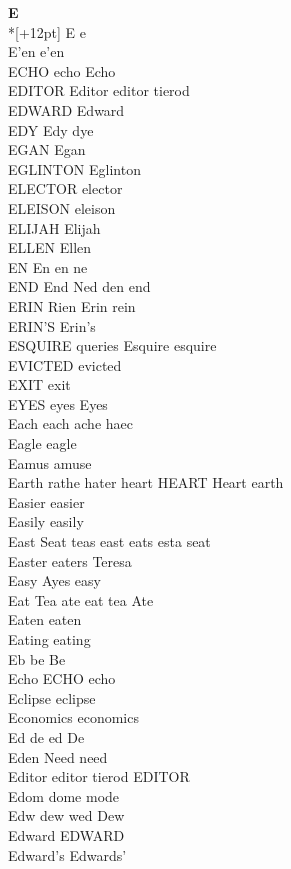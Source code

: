 \vspace{14pt}
\noindent\textbf{\Large E}\\*[+12pt]
E e\\
E'en e'en\\
ECHO echo Echo\\
EDITOR Editor editor tierod\\
EDWARD Edward\\
EDY Edy dye\\
EGAN Egan\\
EGLINTON Eglinton\\
ELECTOR elector\\
ELEISON eleison\\
ELIJAH Elijah\\
ELLEN Ellen\\
EN En en ne\\
END End Ned den end\\
ERIN Rien Erin rein\\
ERIN'S Erin's\\
ESQUIRE queries Esquire esquire\\
EVICTED evicted\\
EXIT exit\\
EYES eyes Eyes\\
Each each ache haec\\
Eagle eagle\\
Eamus amuse\\
Earth rathe hater heart HEART Heart earth\\
Easier easier\\
Easily easily\\
East Seat teas east eats esta seat\\
Easter eaters Teresa\\
Easy Ayes easy\\
Eat Tea ate eat tea Ate\\
Eaten eaten\\
Eating eating\\
Eb be Be\\
Echo ECHO echo\\
Eclipse eclipse\\
Economics economics\\
Ed de ed De\\
Eden Need need\\
Editor editor tierod EDITOR\\
Edom dome mode\\
Edw dew wed Dew\\
Edward EDWARD\\
Edward's Edwards'\\
